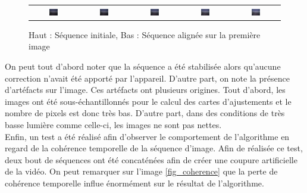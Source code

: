 \begin{figure}[H]
\begin{tabular}{ccccc}
\includegraphics[width = 0.2\textwidth]{Chapters/Images/Seq_ill_stab/2}&
\includegraphics[width = 0.2\textwidth]{Chapters/Images/Seq_ill_stab/3}&
\includegraphics[width = 0.2\textwidth]{Chapters/Images/Seq_ill_stab/4}&
\includegraphics[width = 0.2\textwidth]{Chapters/Images/Seq_ill_stab/5}&
\includegraphics[width = 0.2\textwidth]{Chapters/Images/Seq_ill_stab/6}

\end{tabular}
\caption{Haut : Séquence initiale, Bas : Séquence alignée sur la première image}
\label{fig_illum}
\end{figure}


On peut tout d'abord noter que la séquence a été stabilisée alors qu'aucune correction n'avait été apporté par l'appareil. D'autre part, on note la présence d'artéfacts sur l'image. Ces artéfacts ont plusieurs origines. Tout d'abord, les images ont été sous-échantillonnés pour le calcul des cartes d'ajustements et le nombre de pixels est donc très bas. D'autre part, dans des conditions de très basse lumière comme celle-ci, les images ne sont pas nettes.\\

Enfin, un test a été réalisé afin d'observer le comportement de l'algorithme en regard de la cohérence temporelle de la séquence d'image. Afin de réalisée ce test, deux bout de séquences ont été concaténées afin de créer une coupure artificielle de la vidéo. On peut remarquer sur l'image \ref{fig_coherence} que la perte de cohérence temporelle influe énormément sur le résultat de l'algorithme.

